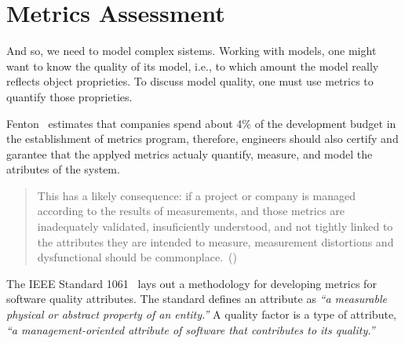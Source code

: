 \section{Metrics Assessment} \label{assess}






\begin{comment}
Effective management of any process requires quantification, measurement, and modeling. Software metrics provide a quantitative basis for the development and validation of models of the software development process. Metrics can be used to improve software productivity and quality.~(\cite{g1:Millis:1998})
\end{comment}



\par And so, we need to model complex sistems. Working with models, one might want to know the quality of its model, i.e., to which amount the model really reflects object proprieties. To discuss model quality, one must use metrics to quantify those proprieties.

\par Fenton~\cite{g1:Fenton:1999} estimates that companies spend about 4\% of the development budget in the establishment of metrics program, therefore, engineers should also certify and garantee that the applyed metrics actualy quantify, measure, and model the atributes of the system.
\begin{quotation}
	This has a likely consequence: if a project or company is managed according to the results of measurements, and those metrics are inadequately validated, insuficiently understood, and not tightly linked to the attributes they are intended to measure, measurement distortions and dysfunctional should be commonplace.~(\cite{g1:kaner:2004})
\end{quotation}


\par The IEEE Standard 1061~\cite{g1:Ieee1061:1998} lays out a methodology for developing metrics for software quality attributes. The standard defines an attribute as \emph{``a measurable physical or abstract property of an entity.''} A quality factor is a type of attribute, \emph{``a management-oriented attribute of software that contributes to its quality.''}

